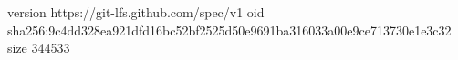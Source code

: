 version https://git-lfs.github.com/spec/v1
oid sha256:9c4dd328ea921dfd16bc52bf2525d50e9691ba316033a00e9ce713730e1e3c32
size 344533
